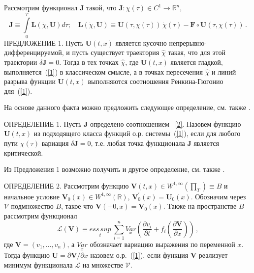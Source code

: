 Рассмотрим функционал $\mathbf{J}$ такой, что
$\mathbf{J}:\chi(\tau)\in C^{1}\rightarrow\mathbb{R}^{n}$,
\begin{equation}\label{2}
\mathbf{J}\equiv\int\limits_{0}^{T}\mathbf{L}(\dot{\chi},\mathbf{U})d\tau;\quad\mathbf{L}(\dot{\chi},\mathbf{U})\equiv\mathbf{U}(\tau,\chi(\tau))
\,\dot{\chi}(\tau)-\mathbf{F}\circ\mathbf{U}(\tau,\chi(\tau))\,.
\end{equation}
ПРЕДЛОЖЕНИЕ 1. Пусть $\mathbf{U}(t,x)$ является кусочно
непрерывно-дифференцируемой, и пусть существует траектория
$\hat{\chi}$ такая, что для этой траектории $\delta\mathbf{J}=0$.
Тогда в тех точках $\hat{\chi}$, где $\mathbf{U}(t,x)$ является
гладкой, выполняется~(\ref{1}) в классическом смысле, а в точках
пересечения $\hat{\chi}$ и линий разрыва функции $\mathbf{U}(t,x)$
выполняются соотношения Ренкина-Гюгонио для~(\ref{1}).

На основе данного факта можно предложить следующее определение, см.
также \cite{R1}.

ОПРЕДЕЛЕНИЕ 1. Пусть $\mathbf{J}$ определено соотношением
~\eqref{2}. Назовем функцию $\mathbf{U}(t,x)$ из подходящего класса
функций о.р. системы~(\ref{1}), если для любого пути $\chi(\tau)$
вариация $\delta\mathbf{J}=0$, т.е. любая точка функционала
$\mathbf{J}$ является критической.

Из Предложения 1 возможно получить и другое определение, см. также
\cite{R2}.

ОПРЕДЕЛЕНИЕ 2. Рассмотрим функцию $\mathbf{V}(t,x)\in
W^{1,\infty}(\prod_{T})\equiv B$ и начальное условие
$\mathbf{V}_{0}(x)\in W^{1,\infty}(\mathbb{R})$,
$\mathbf{V}_{0}^{\prime}(x)=\mathbf{U}_{0}(x)$. Обозначим через
$\mathcal V$ подмножество $B$, такое что
$\mathbf{V}(+0,x)=\mathbf{V}_{0}(x)$. Также на пространстве $B$
рассмотрим функционал $${\mathcal L}(\mathbf{V})\equiv\underset
{t}{ess\,sup}\ \sum_{i=1}^{n}\underset{x}{Var}\left(\frac{\partial
v_{i}}{\partial t}+f_{i}\left(\frac{\partial\mathbf{V}}{\partial
x}\right)\right)\,,$$
где $\mathbf{V}=\left(v_{1},\ldots,v_{n}\right)$, а
$\underset{x}{Var}$ обозначает вариацию выражения по переменной
$x$. Тогда функцию $\mathbf{U}=\partial\mathbf{V}/\partial x$
назовем о.р.~(\ref{1}), если функция $\mathbf{V}$ реализует минимум
функционала $\mathcal L$ на множестве $\mathcal V$.


